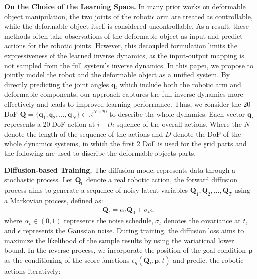 \documentclass{article}
\begin{document}
\textbf{On the Choice of the Learning Space. } In many prior works on deformable object manipulation, the two joints of the robotic arm are treated as controllable, while the deformable object itself is considered uncontrollable. As a result, these methods often take observations of the deformable object as input and predict actions for the robotic joints. However, this decoupled formulation limits the expressiveness of the learned inverse dynamics, as the input-output mapping is not sampled from the full system's inverse dynamics. In this paper, we propose to jointly model the robot and the deformable object as a unified system. By directly predicting the joint angles $\bm{q}$, which include both the robotic arm and deformable components, our approach captures the full inverse dynamics more effectively and leads to improved learning performance. Thus, we consider the 20-DoF $\bm{Q} = \{\boldsymbol{q}_1, \boldsymbol{q}_2, \dots, \boldsymbol{q}_N\}  \in \mathbb{R}^{N\times 20}$ to describe the whole dynamics. Each vector $\boldsymbol{q}_i$ represents a 20-DoF action at $i-th$ squence of the overall actions. Where the $N$ denote the length of the sequence of the actions and $D$ denote the DoF of the whole dynamics systems, in which the first 2 DoF is used for the grid parts and the following are used to discribe the deformable objects parts. 


\textbf{Diffusion-based Training.}
The diffusion model represents data through a stochastic process. Let $\bm{Q}_{0}$ denote a real robotic action, the forward diffusion process aims to generate a sequence of noisy latent variables $\bm{Q}_1,\bm{Q}_2, ..., \bm{Q}_T$ using a Markovian process, defined as:
\begin{equation}
    \begin{aligned}
        \bm{Q}_t = \alpha_t \bm{Q}_0 + \sigma_t\epsilon ,
    \end{aligned}	
    \label{eq: c-ddpm-forward}
\end{equation}
where $ \alpha_t \in(0,1)$ represents the noise schedule, $\sigma_t$ denotes the covariance at $t$, and $\epsilon$ represents the Gaussian noise. During training, the diffusion loss aims to maximize the likelihood of the sample results by using the variational lower bound. In the reverse process, we incorporate the position of the goal condition $ \bm{p}$ as the conditioning of the score functions $\epsilon_\eta(\bm{Q}_t, \bm{p}, t)$ and predict the robotic actions iteratively:
\end{document}
